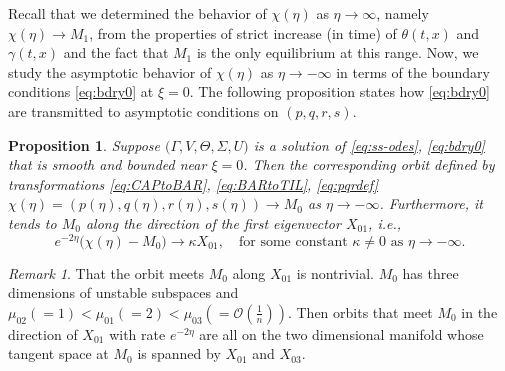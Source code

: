 \documentclass[a4paper,11pt]{article}
\def\BO{{\mathcal{O}}}
\newtheorem{proposition}{Proposition}[section]
\theoremstyle{remark}
\newtheorem{remark}{Remark}[section]
\begin{document}
Recall that we determined the behavior of $\chi(\eta)$ as $\eta \rightarrow \infty$, namely $\chi(\eta) \rightarrow M_1$, from the properties of
strict increase (in time) of  $\theta(t,x)$ and $\gamma(t,x)$ 
and the fact that $M_1$ is the only equilibrium at this range. 
Now, we study the asymptotic behavior of $\chi(\eta)$ as $\eta \rightarrow -\infty$ in terms of the boundary conditions \eqref{eq:bdry0} at $\xi=0$.
The following proposition states how \eqref{eq:bdry0} are transmitted to asymptotic conditions on $(p,q,r,s)$.

\begin{proposition} \label{prop1}
    Suppose $\big(\Gamma,V,\Theta,\Sigma,U\big)$ is a solution of \eqref{eq:ss-odes}, \eqref{eq:bdry0} that is smooth and bounded near $\xi=0$. Then the corresponding orbit defined by transformations \eqref{eq:CAPtoBAR}, \eqref{eq:BARtoTIL}, \eqref{eq:pqrdef} $\chi(\eta) = (p(\eta), q(\eta), r(\eta),s(\eta)) \rightarrow M_0$ as $\eta \rightarrow -\infty$. Furthermore, it tends to $M_0$ along the direction of the first eigenvector $X_{01}$, i.e.,
    \begin{equation} \label{eq:alpha}
     e^{-2\eta}\big(\chi(\eta) - M_0 \big) \rightarrow \kappa X_{01}, \quad \text{for some constant $\kappa\ne0$ as $\eta \rightarrow -\infty$.}
    \end{equation}
\end{proposition}

\begin{remark} \label{rem:alpha}
  That the orbit meets $M_0$ along $X_{01}$ is nontrivial. $M_0$ has three dimensions of unstable subspaces and $\mu_{02}(=1)<\mu_{01}(=2)<\mu_{03}(=\BO(\frac{1}{n}))$. %
  Then orbits that meet $M_0$ in the direction of $X_{01}$ with rate $e^{-2\eta}$ are all on the two dimensional manifold whose tangent space at $M_0$ is spanned by $X_{01}$ and $X_{03}$.
\end{remark}
\end{document}
